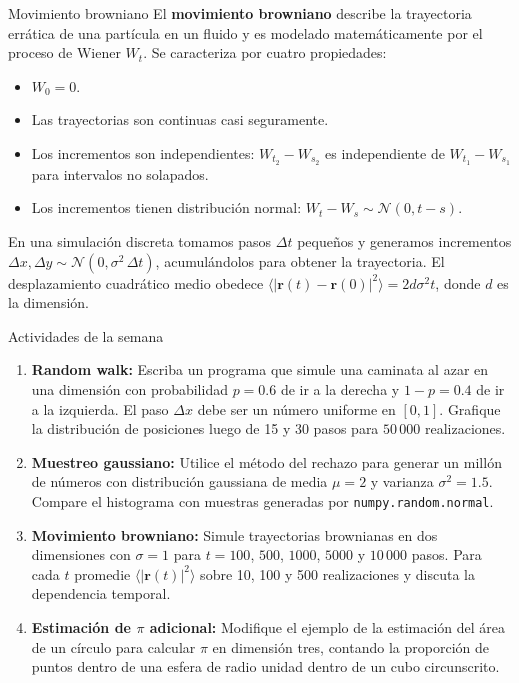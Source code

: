 \begin{frame}{Movimiento browniano}
\small
\justifying
El \textbf{movimiento browniano} describe la trayectoria errática de una
partícula en un fluido y es modelado matemáticamente por el proceso de Wiener
$W_t$. Se caracteriza por cuatro propiedades:
\begin{itemize}
    \item $W_0 = 0$.
    \item Las trayectorias son continuas casi seguramente.
    \item Los incrementos son independientes: $W_{t_2}-W_{s_2}$ es independiente de $W_{t_1}-W_{s_1}$ para intervalos no solapados.
    \item Los incrementos tienen distribución normal: $W_t-W_s \sim \mathcal{N}(0,t-s)$.
\end{itemize}
En una simulación discreta tomamos pasos $\Delta t$ pequeños y generamos
incrementos $\Delta x,\Delta y \sim \mathcal{N}(0,\sigma^2\,\Delta t)$,
acumulándolos para obtener la trayectoria. El desplazamiento cuadrático medio
obedece $\langle|\bm{r}(t)-\bm{r}(0)|^2\rangle = 2d\sigma^2 t$, donde $d$ es la
dimensión.
\end{frame}

\begin{frame}{Actividades de la semana}
\small
\begin{enumerate}
    \setlength\itemsep{0.35em}
    \item \textbf{Random walk:} Escriba un programa que simule una caminata al azar en una dimensión con probabilidad $p=0.6$ de ir a la derecha y $1-p=0.4$ de ir a la izquierda. El paso $\Delta x$ debe ser un número uniforme en $[0,1]$. Grafique la distribución de posiciones luego de 15 y 30 pasos para $50\,000$ realizaciones.
    \item \textbf{Muestreo gaussiano:} Utilice el método del rechazo para generar un millón de números con distribución gaussiana de media $\mu=2$ y varianza $\sigma^2=1.5$. Compare el histograma con muestras generadas por \texttt{numpy.random.normal}.
    \item \textbf{Movimiento browniano:} Simule trayectorias brownianas en dos dimensiones con $\sigma=1$ para $t=100$, $500$, $1000$, $5000$ y $10\,000$ pasos. Para cada $t$ promedie $\langle|\bm{r}(t)|^2\rangle$ sobre 10, 100 y 500 realizaciones y discuta la dependencia temporal.
    \item \textbf{Estimación de $\pi$ adicional:} Modifique el ejemplo de la estimación del área de un círculo para calcular $\pi$ en dimensión tres, contando la proporción de puntos dentro de una esfera de radio unidad dentro de un cubo circunscrito.
\end{enumerate}
\end{frame}

